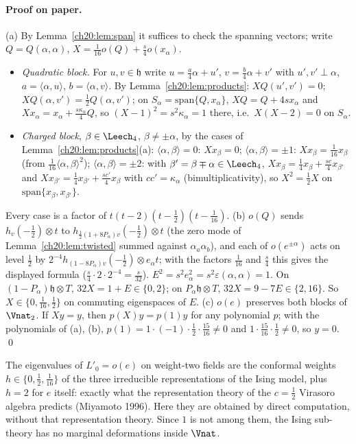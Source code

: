 \paragraph{Proof on paper.}  (a) By Lemma~\ref{ch20:lem:span} it suffices to check the spanning vectors; write
$Q=Q(\alpha,\alpha)$, $X=\tfrac1{16}o(Q)+\tfrac s4o(x_\alpha)$.
\begin{itemize}
\item \emph{Quadratic block.}  For $u,v\in\mathfrak h$ write $u=\tfrac{a}{4}\alpha+u'$, $v=\tfrac b4\alpha+v'$ with $u',v'\perp\alpha$,
  $a=\langle\alpha,u\rangle$, $b=\langle\alpha,v\rangle$.  By Lemma~\ref{ch20:lem:products}: $XQ(u',v')=0$;
  $XQ(\alpha,v')=\tfrac12Q(\alpha,v')$; on $S_\alpha=\mathrm{span}\{Q,x_\alpha\}$, $XQ=Q+4sx_\alpha$ and
  $Xx_\alpha=x_\alpha+\tfrac{s\kappa_\alpha}4Q$, so $(X-1)^2=s^2\kappa_\alpha=1$ there, i.e.\ $X(X-2)=0$ on $S_\alpha$.
\item \emph{Charged block}, $\beta\in\chtwentyLf$, $\beta\ne\pm\alpha$, by the cases of Lemma~\ref{ch20:lem:products}(a):
  $\langle\alpha,\beta\rangle=0$: $Xx_\beta=0$; $\langle\alpha,\beta\rangle=\pm1$: $Xx_\beta=\tfrac1{16}x_\beta$ (from $\tfrac1{16}\langle\alpha,\beta\rangle^2$);
  $\langle\alpha,\beta\rangle=\pm2$: with $\beta'=\beta\mp\alpha\in\chtwentyLf$, $Xx_\beta=\tfrac14x_\beta+\tfrac{sc}4x_{\beta'}$ and
  $Xx_{\beta'}=\tfrac14x_{\beta'}+\tfrac{sc'}4x_\beta$ with $cc'=\kappa_\alpha$ (bimultiplicativity), so $X^2=\tfrac12X$ on
  $\mathrm{span}\{x_\beta,x_{\beta'}\}$.
\end{itemize}
Every case is a factor of $t(t-2)(t-\tfrac12)(t-\tfrac1{16})$.  (b) $o(Q)$ sends $h_v(-\tfrac12)\otimes t$ to
$h_{\frac12(1+8P_\alpha)v}(-\tfrac12)\otimes t$ (the zero mode of Lemma~\ref{ch20:lem:twisted} summed against
$\alpha_a\alpha_b$), and each of $o(e^{\pm\alpha})$ acts on level $\tfrac12$ by $2^{-4}h_{(1-8P_\alpha)v}(-\tfrac12)\otimes e_\alpha t$; with
the factors $\tfrac1{16}$ and $\tfrac s4$ this gives the displayed formula ($\tfrac s4\cdot2\cdot2^{-4}=\tfrac s{32}$).  $E^2=s^2e_\alpha^2=s^2\varepsilon(\alpha,\alpha)=1$.  On
$(1-P_\alpha)\mathfrak h\otimes T$, $32X=1+E\in\{0,2\}$; on $P_\alpha\mathfrak h\otimes T$, $32X=9-7E\in\{2,16\}$.  So
$X\in\{0,\tfrac1{16},\tfrac12\}$ on commuting eigenspaces of $E$.  (c) $o(e)$ preserves both blocks of $\Vnat_2$.  If
$Xy=y$, then $p(X)y=p(1)y$ for any polynomial $p$; with the polynomials of (a), (b), $p(1)=1\cdot(-1)\cdot\tfrac12\cdot\tfrac{15}{16}\ne0$
and $1\cdot\tfrac{15}{16}\cdot\tfrac12\ne0$, so $y=0$. \qed
\begin{physics}
The eigenvalues of $L'_0=o(e)$ on weight-two fields are the conformal weights $h\in\{0,\tfrac12,\tfrac1{16}\}$ of the three
irreducible representations of the Ising model, plus $h=2$ for $e$ itself: exactly what the representation theory of
the $c=\tfrac12$ Virasoro algebra predicts (Miyamoto 1996).  Here they are obtained by direct computation, without that
representation theory.  Since $1$ is not among them, the Ising sub-theory has no marginal deformations inside $\Vnat$.
\end{physics}
